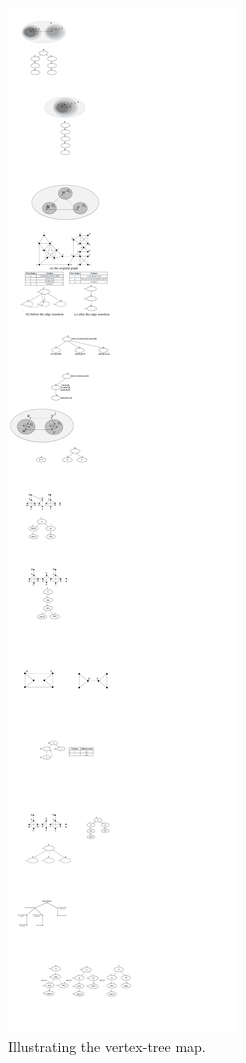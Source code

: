 
\begin{figure}[ht]
    \centering
    \includegraphics[width=0.8\linewidth]{figures/traceChild}
    \caption{Illustrating the vertex-tree map.}
    \label{fig:trace}
\end{figure}


